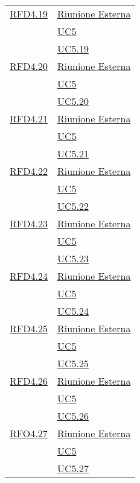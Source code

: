 \begin{longtable}{|>{\centering}m{5cm}|m{5cm}<{\centering}|}
\hyperlink{RFD4.19}{RFD4.19} & \hyperlink{Riunione Esterna}{Riunione Esterna}\\ &\hyperref[UC5]{UC5}\\  &\hyperref[UC5.19]{UC5.19}\\ \hline

\hyperlink{RFD4.20}{RFD4.20} &   \hyperlink{Riunione Esterna}{Riunione Esterna}\\ &\hyperref[UC5]{UC5}\\ &\hyperref[UC5.20]{UC5.20}\\ \hline

\hyperlink{RFD4.21}{RFD4.21} & \hyperlink{Riunione Esterna}{Riunione Esterna}\\ &\hyperref[UC5]{UC5}\\  &\hyperref[UC5.21]{UC5.21}\\ \hline

\hyperlink{RFD4.22}{RFD4.22} &   \hyperlink{Riunione Esterna}{Riunione Esterna}\\ &\hyperref[UC5]{UC5}\\ &\hyperref[UC5.22]{UC5.22}\\ \hline

\hyperlink{RFD4.23}{RFD4.23} & \hyperlink{Riunione Esterna}{Riunione Esterna}\\ &\hyperref[UC5]{UC5}\\  &\hyperref[UC5.23]{UC5.23}\\ \hline

\hyperlink{RFD4.24}{RFD4.24} & \hyperlink{Riunione Esterna}{Riunione Esterna}\\ &\hyperref[UC5]{UC5}\\ &\hyperref[UC5.24]{UC5.24}\\ \hline

\hyperlink{RFD4.25}{RFD4.25} & \hyperlink{Riunione Esterna}{Riunione Esterna}\\ &\hyperref[UC5]{UC5}\\  &\hyperref[UC5.25]{UC5.25}\\ \hline

\hyperlink{RFD4.26}{RFD4.26}  &  \hyperlink{Riunione Esterna}{Riunione Esterna}\\ &\hyperref[UC5]{UC5}\\ &\hyperref[UC5.26]{UC5.26}\\ \hline

\hyperlink{RFO4.27}{RFO4.27} &  \hyperlink{Riunione Esterna}{Riunione Esterna}\\ &\hyperref[UC5]{UC5}\\ &\hyperref[UC5.27]{UC5.27}\\ \hline


\end{longtable}

